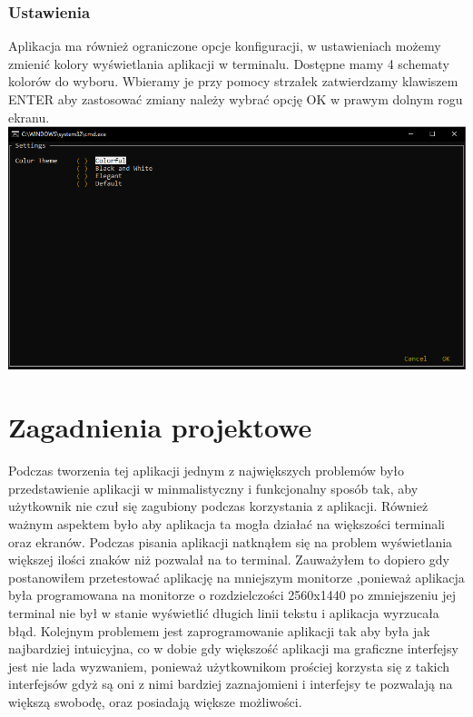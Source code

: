 \documentclass{article}
\begin{document}
\subsubsection{Ustawienia}

Aplikacja ma również ograniczone opcje konfiguracji, w ustawieniach możemy zmienić kolory wyświetlania aplikacji w terminalu. Dostępne mamy
4 schematy kolorów do wyboru. Wbieramy je przy pomocy strzałek zatwierdzamy klawiszem ENTER aby zastosować zmiany należy wybrać opcję OK w prawym dolnym rogu ekranu.\\
\includegraphics[width=\textwidth]{images/settings.png}\\


\section{Zagadnienia projektowe}

Podczas tworzenia tej aplikacji jednym z największych problemów było przedstawienie aplikacji w minmalistyczny i funkcjonalny sposób tak,
aby użytkownik nie czuł się zagubiony podczas korzystania z aplikacji. Również ważnym aspektem było aby aplikacja ta mogła działać na większości terminali oraz
ekranów. Podczas pisania aplikacji natknąłem się na problem wyświetlania większej ilości znaków  niż pozwalał na to terminal. Zauważyłem to dopiero gdy postanowiłem przetestować aplikację na mniejszym monitorze
,ponieważ aplikacja była programowana na monitorze o rozdzielczości 2560x1440 po zmniejszeniu jej terminal nie był w stanie wyświetlić długich linii tekstu i aplikacja wyrzucała błąd.
Kolejnym problemem jest zaprogramowanie aplikacji tak aby była jak najbardziej intuicyjna, co w dobie gdy większość aplikacji ma graficzne interfejsy
jest nie lada wyzwaniem, ponieważ użytkownikom prościej korzysta się z takich interfejsów gdyż są oni z nimi bardziej zaznajomieni i interfejsy te pozwalają na większą swobodę, oraz posiadają większe możliwości.
\end{document}
